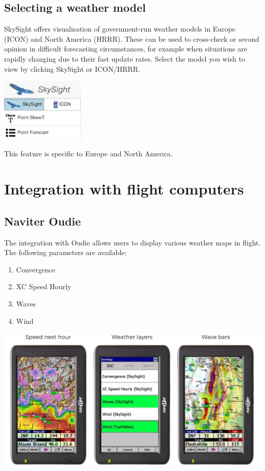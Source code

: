 \documentclass[11pt,a4paper]{article}
\begin{document}
\subsection{Selecting a weather model}
SkySight offers visualisation of government-run weather models in Europe (ICON) and North America (HRRR). These can be used to cross-check or second opinion in difficult forecasting circumstances, for example when situations are rapidly changing due to their fast update rates. Select the model you wish to view by clicking SkySight or ICON/HRRR.

\begin{center}
  \includegraphics[width=4cm]{images/icon_model.png}
  \end{center}

\begin{tip}
  \item This feature is specific to Europe and North America.\\
\end{tip} 
  

\section{Integration with flight computers}
\subsection{Naviter Oudie}\label{subsec:oudie}
The integration with Oudie allows users to display various weather maps in flight. The following parameters are available:
\begin{enumerate}
\item Convergence
\item XC Speed Hourly
\item Waves
\item Wind
\end{enumerate}

\begin{center}
\includegraphics[width=16cm]{images/oudie.png}
\end{center}
\end{document}
